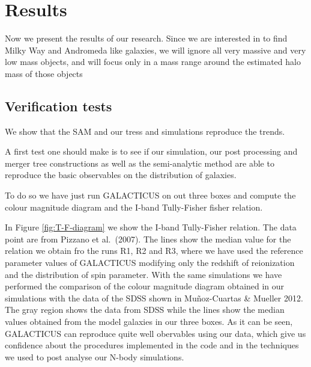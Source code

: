 \documentclass[useAMS,usenatbib]{mn2e}
\newcommand{\etal}{et al.~}
\begin{document}
\section{Results}
\label{sec:results}

Now we present the results of our research. Since we are interested in
to find Milky Way and Andromeda like galaxies, we will ignore all
very massive and very low mass objects, and will focus only in a mass
range around the estimated halo mass of those objects

\subsection{Verification tests}

We show that the SAM and our tress and simulations reproduce the
trends.

A first test one should make is to see if our simulation, our post
processing and merger tree constructions as well as the semi-analytic
method are able to reproduce the basic observables on the distribution
of galaxies.

To do so we have just run GALACTICUS on out three boxes and compute
the colour magnitude diagram and the I-band Tully-Fisher fisher relation.

In Figure \ref{fig:T-F-diagram} we show the I-band Tully-Fisher
relation. The data point are from Pizzano \etal (2007). The lines show
the median value for the relation we obtain fro the runs R1, R2 and
R3, where we have used the reference parameter values of GALACTICUS
modifying only the redshift of reionization and the distribution of
spin parameter. With the same simulations we have performed the
comparison of the colour magnitude diagram obtained in our simulations
with the data of the SDSS shown in Mu\~noz-Cuartas \& Mueller
2012. The gray region shows the data from SDSS while the lines show
the median values obtained from the model galaxies in our three boxes.
As it can be seen, GALACTICUS can reproduce quite well obervables
using our data, which give us confidence about the procedures
implemented in the code and in the techniques we used to post analyse
our N-body simulations.
\end{document}
